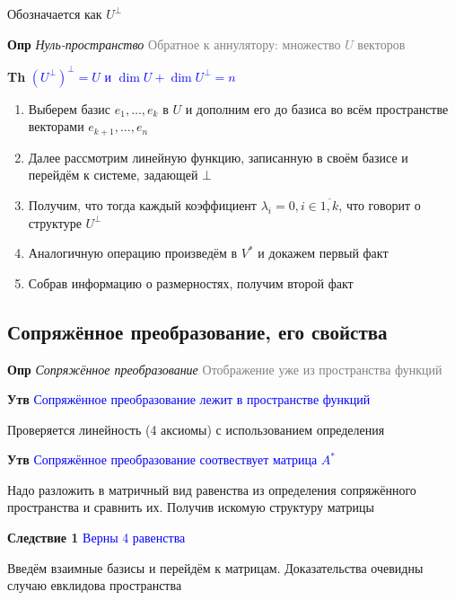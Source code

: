 \documentclass[a4paper, 14pt]{article}
\begin{document}
    Обозначается как $U^\bot$

    
    \textbf{Опр} \textit{Нуль-пространство} \textcolor{gray}{Обратное к аннулятору: множество $U$ векторов}

    
    \textbf{Th} \textcolor{blue}{$(U^\bot)^\bot = U$ и $\dim U + \dim U^\bot = n$}
    
    \begin{enumerate}
        \item Выберем базис $e_1, \dots, e_k$ в $U$ и дополним его до базиса во всём пространстве векторами $e_{k+1},
        \dots, e_n$
        \item Далее рассмотрим линейную функцию, записанную в своём базисе и перейдём к системе, задающей $\bot$
        \item Получим, что тогда каждый коэффициент $\lambda_i = 0, i \in \overline{1, k}$, что говорит о структуре $
        U^\bot$
        \item Аналогичную операцию произведём в $V^*$ и докажем первый факт
        \item Собрав информацию о размерностях, получим второй факт
    \end{enumerate}
    
    \subsection{Сопряжённое преобразование, его свойства}
    
    \textbf{Опр} \textit{Сопряжённое преобразование} \textcolor{gray}{Отображение уже из пространства функций}
    
    \textbf{Утв} \textcolor{blue}{Сопряжённое преобразование лежит в пространстве функций}
    
    Проверяется линейность (4 аксиомы) с использованием определения
    
    \textbf{Утв} \textcolor{blue}{Сопряжённое преобразование соотвествует матрица $A^*$}
    
    Надо разложить в матричный вид равенства из определения сопряжённого пространства и сравнить их.
    Получив искомую структуру матрицы
    
    \textbf{Следствие 1} \textcolor{blue}{Верны 4 равенства}
    
    Введём взаимные базисы и перейдём к матрицам.
    Доказательства очевидны случаю евклидова пространства
    
\end{document}
